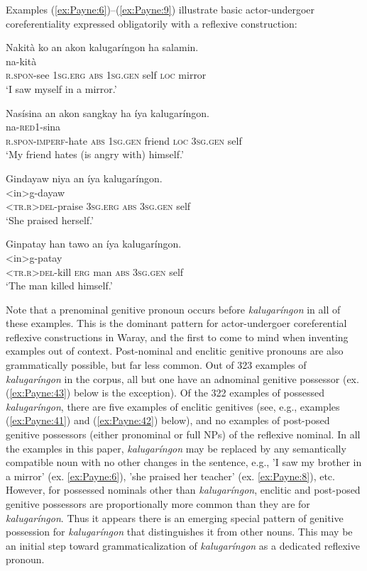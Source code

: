 \documentclass[output=paper]{langscibook}
\begin{document}
Examples (\ref{ex:Payne:6})--(\ref{ex:Payne:9}) illustrate basic actor-undergoer coreferentiality expressed obligatorily with a reflexive construction:

\ea\label{ex:Payne:6}
\glll
Nakità ko an akon kalugaríngon ha salamin.\\
na-kità\\
\textsc{r.spon}-see 1\textsc{sg.erg}  \textsc{abs} 1\textsc{sg.gen} self \textsc{loc} mirror\\
\glt ‘I saw myself in a mirror.'  
\z

\ea\label{ex:Payne:7}
\glll
Nasísina an akon sangkay ha íya kalugaríngon. \\
na-\textsc{red}1-sina\\
\textsc{r.spon-imperf}-hate \textsc{abs} 1\textsc{sg.gen} friend \textsc{loc} 3\textsc{sg.gen} self\\
\glt ‘My friend hates (is angry with) himself.'
\z

\ea\label{ex:Payne:8}
\glll
Gindayaw niya an íya kalugaríngon.\\
<in>g-dayaw  \\
\textsc{<tr.r>del}-praise 3\textsc{sg.erg} \textsc{abs} 3\textsc{sg.gen} self\\
\glt ‘She praised herself.'
\z


\ea\label{ex:Payne:9}
\glll Ginpatay han tawo an íya kalugaríngon.\\
<in>g-patay\\
\textsc{<tr.r>del}-kill \textsc{erg} man \textsc{abs} 3\textsc{sg.gen} self\\
\glt ‘The man killed himself.'
\z


Note that a prenominal genitive pronoun occurs before \textit{kalugaríngon} in all of these examples. This is the dominant pattern for actor-undergoer coreferential reflexive constructions in Waray, and the first to come to mind when inventing examples out of context. Post-nominal and enclitic genitive pronouns are also grammatically possible, but far less common. Out of 323 examples of \textit{kalugaríngon} in the corpus, all but one have an adnominal genitive possessor (ex. (\ref{ex:Payne:43}) below is the exception). Of the 322 examples of possessed \textit{kalugaríngon}, there are five examples of enclitic genitives (see, e.g., examples (\ref{ex:Payne:41}) and (\ref{ex:Payne:42}) below), and no examples of post-posed genitive possessors (either pronominal or full NPs) of the reflexive nominal. In all the examples in this paper, \textit{kalugaríngon} may be replaced by any semantically compatible noun with no other changes in the sentence, e.g., 'I saw my brother in a mirror' (ex. \ref{ex:Payne:6}), 'she praised her teacher' (ex. \ref{ex:Payne:8}), etc. However, for possessed nominals other than \textit{kalugaríngon}, enclitic and post-posed genitive possessors are proportionally more common than they are for \textit{kalugaríngon}. Thus it appears there is an emerging special pattern of genitive possession for \textit{kalugaríngon} that distinguishes it from other nouns. This may be an initial step toward grammaticalization of \textit{kalugaríngon} as a dedicated reflexive pronoun. 
\end{document}
